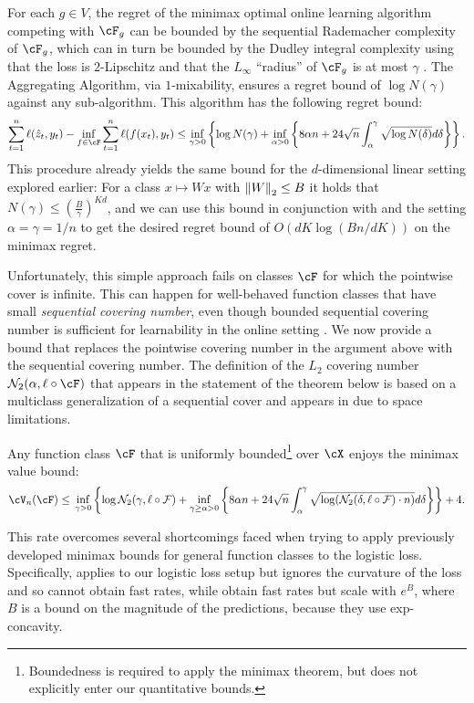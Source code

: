 For each $g \in V$, the regret of the minimax optimal online learning algorithm competing with $\F_g$ can be bounded by the sequential Rademacher complexity of $\F_g$, which can in turn be bounded by the Dudley integral complexity using that the loss is $2$-Lipschitz and that the $L_\infty$ ``radius'' of $\F_g$ is at most $\gamma$ \citep{RakSriTew14jmlr}. The Aggregating Algorithm, via $1$-mixability, ensures a regret bound of $\log N(\gamma)$ against any sub-algorithm. This algorithm has the following regret bound:
\begin{align}
  \label{eq:chaining_simple}
\sum_{t=1}^{n}\ls(\zh_t, y_t) - \inf_{f \in \F}\sum_{t=1}^{n}\ls(f(x_t), y_t) \le \inf_{\gamma >0}  \left\{ \log N(\gamma) + \inf_{\alpha > 0}\left\{8 \alpha n + 24 \sqrt{n} \int_{\alpha}^\gamma \sqrt{\log N(\delta)} d \delta  \right\} \right\}.
\end{align}
This procedure already yields the same bound for the $d$-dimensional linear setting explored earlier: For a class $x\mapsto{}Wx$ with $\nrm*{W}_{2}\leq{}B$ it holds that $N(\gamma) \leq{} \left(\frac{B}{\gamma}\right)^{Kd}$, and we can use this bound in conjunction with  and the setting $\alpha = \gamma = 1/n$ to get the desired regret bound of $O(dK \log(Bn/dK))$ on the minimax regret.

Unfortunately, this simple approach fails on classes $\F$ for which the pointwise cover is infinite. This can happen for well-behaved function classes that have small \emph{sequential covering number}, even though bounded sequential covering number is sufficient for learnability in the online setting \citep{RakSriTew14jmlr}. We now provide a bound that replaces the pointwise covering number in the argument above with the sequential covering number. The definition of the $L_2$ covering number $\mathcal{N}_2(\alpha,\ell \circ \F)$ that appears in the statement of the theorem below is based on a multiclass generalization of a sequential cover and appears in  due to space limitations.
\begin{theorem}
  \label{thm:logistic_minimax}
Any function class $\cF$ that is uniformly bounded\footnote{Boundedness is required to apply the minimax theorem, but does not explicitly enter our quantitative bounds.} over $\cX$ enjoys the minimax value bound:
\begin{equation}
\label{eq:logistic_minimax}
\cV_{n}(\cF) \leq{} \inf_{\gamma >0}  \left\{ \log \mathcal{N}_2(\gamma, \ell \circ \mathcal{F}) + \inf_{\gamma\geq \alpha > 0}\left\{8 \alpha n + 24 \sqrt{n} \int_{\alpha}^\gamma \sqrt{\log \prn*{\mathcal{N}_2(\delta,\ell \circ \mathcal{F})\cdot{}n}} d \delta  \right\} \right\} + 4.
\end{equation}
\end{theorem}
This rate overcomes several shortcomings faced when trying to apply previously developed minimax bounds for general function classes to the logistic loss. Specifically, \cite{RakSriTew14jmlr} applies to our logistic loss setup but ignores the curvature of the loss and so cannot obtain fast rates, while \cite{RakSri15} obtain fast rates but scale with $e^{B}$, where $B$ is a bound on the magnitude of the predictions, because they use exp-concavity.


